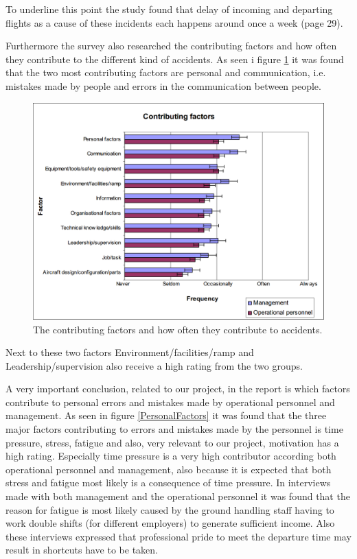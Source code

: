 To underline this point the study found that delay of incoming and departing flights as a cause of these incidents each happens around once a week (page 29).

Furthermore the survey also researched the contributing factors and how often they contribute to the different kind of accidents. As seen i figure \ref{ContributingFactors} it was found that the two most contributing factors are personal and communication, i.e. mistakes made by people and errors in the communication between people.

\begin{figure}[H]
\centering
\includegraphics[width=\textwidth]{Grafik/ContributingFactors}
\caption{The contributing factors and how often they contribute to accidents.}
\label{ContributingFactors}
\end{figure}

Next to these two factors Environment/facilities/ramp and Leadership/supervision also receive a high rating from the two groups. 

A very important conclusion, related to our project, in the report is which factors contribute to personal errors and mistakes made by operational personnel and management. As seen in figure \ref{PersonalFactors} it was found that the three major factors contributing to errors and mistakes made by the personnel is time pressure, stress, fatigue and also, very relevant to our project, motivation has a high rating. Especially time pressure is a very high contributor according both operational personnel and management, also because it is expected that both stress and fatigue most likely is a consequence of time pressure. In interviews made with both management and the operational personnel it was found that the reason for fatigue is most likely caused by the ground handling staff having to work double shifts (for different employers) to generate sufficient income. Also these interviews expressed that professional pride to meet the departure time may result in shortcuts have to be taken.

